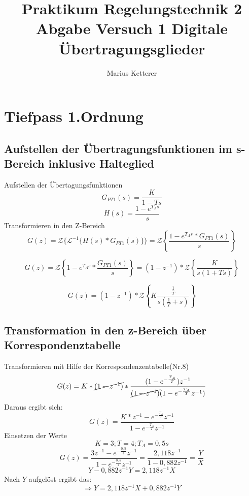 \documentclass[12pt,a4paper]{report}
\author{Marius Ketterer}
\title{Praktikum Regelungstechnik 2 Abgabe Versuch 1 Digitale Übertragungsglieder}
\begin{document}
\maketitle
\tableofcontents

\chapter{Tiefpass 1.Ordnung}
\section{Aufstellen der Übertragungsfunktionen im s-Bereich inklusive Halteglied}
Aufstellen der Übertagungsfunktionen
\begin{equation}
G_{PT1}(s) = \frac{K}{1-Ts} 
\end{equation}
\begin{equation}
H(s) = \frac{1-e^{T_As}}{s}
\end{equation}
Transformieren in den Z-Bereich
\begin{equation}
G(z) = \mathcal{Z}\{\mathcal{L}^{-1}\{H(s)*G_{PT1}(s)\}\} = \mathcal{Z}\left\{\frac{1-e^{T_As}* G_{PT1}(s)}{s}\right\}
\end{equation}

\begin{equation}
G(z) = \mathcal{Z}\left\{1-e^{T_As}*\frac{G_{PT1}(s)}{s}\right\} = (1-z^{-1})*\mathcal{Z}\left\{\frac{K}{s(1+Ts)}\right\}
\end{equation}

\begin{equation}
G(z) = (1-z^{-1})*\mathcal{Z}\left\{K\frac{\frac{1}{T}}{s(\frac{1}{T}+s)}\right\}
\end{equation}
\section{Transformation in den z-Bereich über Korrespondenztabelle}
Transformieren mit Hilfe der Korrespondenzentabelle(Nr.8)
\begin{equation}
G(z) = K*\cancel{(1-z^{-1})}*
\frac{(1-e^{-\frac{T_A}{T}})z^{-1}}
{\cancel{(1-z^{-1})}(1-e^{-\frac{T_A}{T}}z^{-1})}
\end{equation}
Daraus ergibt sich: 
\begin{equation}
G(z) = \frac{K*z^{-1}-e^{-\frac{T_A}{T}}z^{-1}}
{1-e^{-\frac{T_A}{T}}z^{-1}} 
\end{equation}
Einsetzen der Werte
\begin{equation}
K = 3; T = 4; T_A = 0,5s
\end{equation}
\begin{equation}
G(z) = \frac{3z^{-1}-e^{-\frac{0,5}{4}}z^{-1}}
{1-e^{-\frac{0,5}{4}}z^{-1}} = \frac{2,118z^{-1}}{1-0,882z^{-1}} = \frac{Y}{X}
\end{equation}
\begin{equation}
 Y- 0,882z^{-1}Y = 2,118z^{-1}X
\end{equation}
Nach $ Y $ aufgelöst ergibt das:
\begin{equation}
\Rightarrow Y = 2,118z^{-1}X + 0,882z^{-1}Y
\end{equation}
\end{document}
